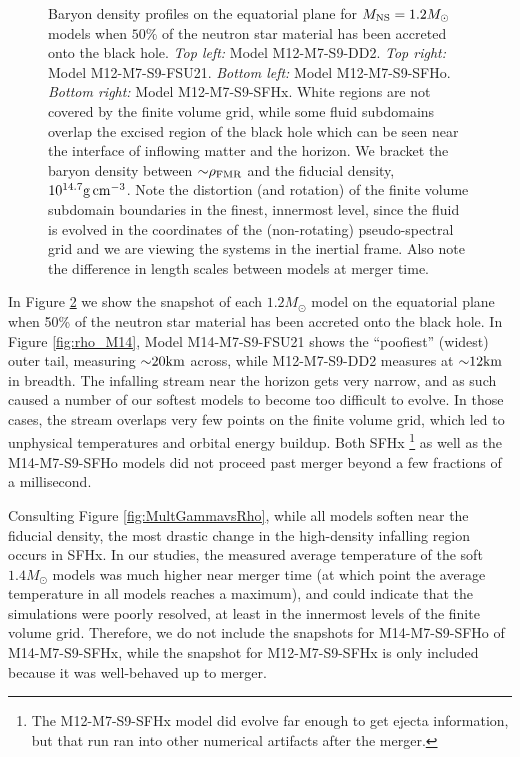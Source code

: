 \begin{figure}
\begin{subfigure}[b]{0.475\textwidth}
		\label{fig:rho_M12_SFHx}
	\end{subfigure}
	\caption[Density profiles on equatorial plane for $1.2 M_{\odot}$ models]{
		Baryon density profiles on the equatorial plane for $M_{\rm NS} = 1.2 M_{\odot}$ models when $50\%$ of the neutron star material has been accreted onto the black hole.
		\textit{Top left:} Model M12-M7-S9-DD2.
		\textit{Top right:} Model M12-M7-S9-FSU21.
		\textit{Bottom left:} Model M12-M7-S9-SFHo.
		\textit{Bottom right:} Model M12-M7-S9-SFHx.
		White regions are not covered by the finite volume grid, while some fluid subdomains overlap the excised region of the black hole which can be seen near the interface of inflowing matter and the horizon.  We bracket the baryon density between $\mathord{\sim} \rho_{\rm FMR}$ and the fiducial density, $10^{14.7} {\rm g\,cm^{-3}}$. Note the distortion (and rotation) of the finite volume subdomain boundaries in the finest, innermost level, since the fluid is evolved in the coordinates of the (non-rotating) pseudo-spectral grid and we are viewing the systems in the inertial frame.  Also note the difference in length scales between models at merger time.
	}
	\label{fig:rho_M12}
\end{figure}

In Figure \ref{fig:rho_M12} we show the snapshot of each $1.2 M_\odot$ model on the equatorial plane when 50\% of the neutron star material has been accreted onto the black hole.  
In Figure \ref{fig:rho_M14}, Model M14-M7-S9-FSU21 shows the ``poofiest'' (widest) outer tail, measuring $\mathord{\sim} 20 {\rm km}$ across, while M12-M7-S9-DD2 measures at $\mathord{\sim} 12 {\rm km}$ in breadth.  
The infalling stream near the horizon gets very narrow, and as such caused a number of our softest models to become too difficult to evolve.  
In those cases, the stream overlaps very few points on the finite volume grid, which led to unphysical temperatures and orbital energy buildup.  
Both SFHx
\footnote{
The M12-M7-S9-SFHx model did evolve far enough to get ejecta information, but that run ran into other numerical artifacts after the merger.
}
as well as the M14-M7-S9-SFHo models did not proceed past merger beyond a few fractions of a millisecond.

Consulting Figure \ref{fig:MultGammavsRho}, while all models soften near the fiducial density, the most drastic change in the high-density infalling region occurs in SFHx.  In our studies, the measured average temperature of the soft $1.4 M_\odot$ models was much higher near merger time (at which point the average temperature in all models reaches a maximum), and could indicate that the simulations were poorly resolved, at least in the innermost levels of the finite volume grid.  Therefore, we do not include the snapshots for M14-M7-S9-SFHo of M14-M7-S9-SFHx, while the snapshot for M12-M7-S9-SFHx is only included because it was well-behaved up to merger.


